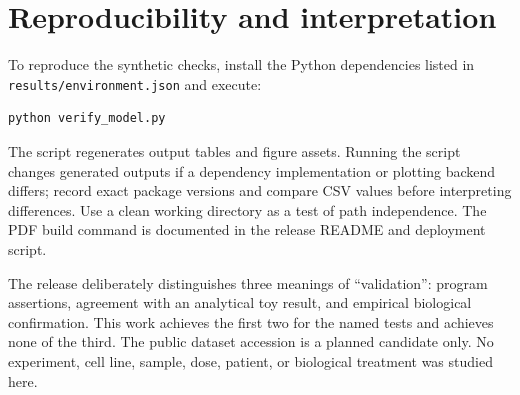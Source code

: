 \documentclass[11pt]{article}
\newcommand{\1}{\mathbf{1}}
\begin{document}
\section{Reproducibility and interpretation}
To reproduce the synthetic checks, install the Python dependencies listed in \texttt{results/environment.json} and execute:
\begin{verbatim}
python verify_model.py
\end{verbatim}
The script regenerates output tables and figure assets. Running the script changes generated outputs if a dependency implementation or plotting backend differs; record exact package versions and compare CSV values before interpreting differences. Use a clean working directory as a test of path independence. The PDF build command is documented in the release README and deployment script.

The release deliberately distinguishes three meanings of “validation”: program assertions, agreement with an analytical toy result, and empirical biological confirmation. This work achieves the first two for the named tests and achieves none of the third. The public dataset accession is a planned candidate only. No experiment, cell line, sample, dose, patient, or biological treatment was studied here.
\end{document}
